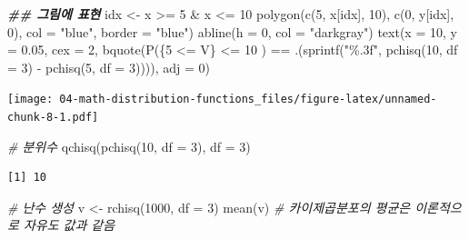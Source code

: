 \documentclass[
  11pt,
]{krantz}
\newenvironment{Shaded}{\begin{snugshade}}{\end{snugshade}}
\newcommand{\AttributeTok}[1]{\textcolor[rgb]{0.61,0.61,0.61}{#1}}
\newcommand{\CommentTok}[1]{\textcolor[rgb]{0.37,0.37,0.37}{\textit{#1}}}
\newcommand{\DecValTok}[1]{\textcolor[rgb]{0.06,0.06,0.06}{#1}}
\newcommand{\DocumentationTok}[1]{\textcolor[rgb]{0.37,0.37,0.37}{\textbf{\textit{#1}}}}
\newcommand{\FloatTok}[1]{\textcolor[rgb]{0.06,0.06,0.06}{#1}}
\newcommand{\FunctionTok}[1]{\textcolor[rgb]{0,0,0}{#1}}
\newcommand{\NormalTok}[1]{#1}
\newcommand{\OtherTok}[1]{\textcolor[rgb]{0.37,0.37,0.37}{#1}}
\newcommand{\SpecialCharTok}[1]{\textcolor[rgb]{0,0,0}{#1}}
\newcommand{\StringTok}[1]{\textcolor[rgb]{0.5,0.5,0.5}{#1}}
\begin{document}
\begin{Shaded}
\begin{Highlighting}[]
\DocumentationTok{\#\# 그림에 표현}
\NormalTok{idx }\OtherTok{\textless{}{-}}\NormalTok{ x }\SpecialCharTok{\textgreater{}=} \DecValTok{5} \SpecialCharTok{\&}\NormalTok{ x }\SpecialCharTok{\textless{}=} \DecValTok{10}
\FunctionTok{polygon}\NormalTok{(}\FunctionTok{c}\NormalTok{(}\DecValTok{5}\NormalTok{, x[idx], }\DecValTok{10}\NormalTok{), }
        \FunctionTok{c}\NormalTok{(}\DecValTok{0}\NormalTok{, y[idx], }\DecValTok{0}\NormalTok{), }
        \AttributeTok{col =} \StringTok{"blue"}\NormalTok{, }
        \AttributeTok{border =} \StringTok{"blue"}\NormalTok{)}
\FunctionTok{abline}\NormalTok{(}\AttributeTok{h =} \DecValTok{0}\NormalTok{, }\AttributeTok{col =} \StringTok{"darkgray"}\NormalTok{)}
\FunctionTok{text}\NormalTok{(}\AttributeTok{x =} \DecValTok{10}\NormalTok{, }\AttributeTok{y =} \FloatTok{0.05}\NormalTok{, }\AttributeTok{cex =} \DecValTok{2}\NormalTok{, }
     \FunctionTok{bquote}\NormalTok{(}\FunctionTok{P}\NormalTok{(\{}\DecValTok{5} \SpecialCharTok{\textless{}=}\NormalTok{ V\} }\SpecialCharTok{\textless{}=} \DecValTok{10}\NormalTok{ ) }\SpecialCharTok{==}
\NormalTok{              .(}\FunctionTok{sprintf}\NormalTok{(}\StringTok{"\%.3f"}\NormalTok{, }\FunctionTok{pchisq}\NormalTok{(}\DecValTok{10}\NormalTok{, }\AttributeTok{df =} \DecValTok{3}\NormalTok{) }\SpecialCharTok{{-}} \FunctionTok{pchisq}\NormalTok{(}\DecValTok{5}\NormalTok{, }\AttributeTok{df =} \DecValTok{3}\NormalTok{)))),}
     \AttributeTok{adj =} \DecValTok{0}\NormalTok{)}
\end{Highlighting}
\end{Shaded}

\texttt{[image: 04-math-distribution-functions\_files/figure-latex/unnamed-chunk-8-1.pdf]}

\begin{Shaded}
\begin{Highlighting}[]
\CommentTok{\# 분위수}
\FunctionTok{qchisq}\NormalTok{(}\FunctionTok{pchisq}\NormalTok{(}\DecValTok{10}\NormalTok{, }\AttributeTok{df =} \DecValTok{3}\NormalTok{), }\AttributeTok{df =} \DecValTok{3}\NormalTok{) }
\end{Highlighting}
\end{Shaded}

\begin{verbatim}
[1] 10
\end{verbatim}

\begin{Shaded}
\begin{Highlighting}[]
\CommentTok{\# 난수 생성}
\NormalTok{v }\OtherTok{\textless{}{-}} \FunctionTok{rchisq}\NormalTok{(}\DecValTok{1000}\NormalTok{, }\AttributeTok{df =} \DecValTok{3}\NormalTok{)}
\FunctionTok{mean}\NormalTok{(v) }\CommentTok{\# 카이제곱분포의 평균은 이론적으로 자유도 값과 같음 }
\end{Highlighting}
\end{Shaded}
\end{document}
